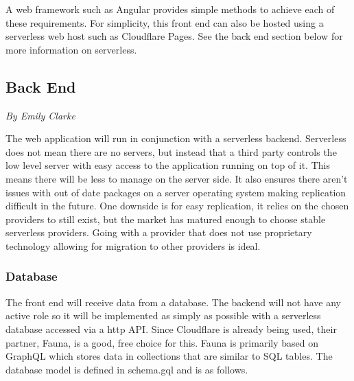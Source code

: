 \documentclass[12pt]{report}
\newcommand{\sectionAuthor}[1]{{\small\vspace{-1em}\textit{#1}}\bigskip\par}
\begin{document}
A web framework such as Angular provides simple methods to achieve each of these requirements. For simplicity, this front end can also be hosted using a serverless web host such as Cloudflare Pages. See the back end section below for more information on serverless.

\subsection{Back End}
\sectionAuthor{By Emily Clarke}
The web application will run in conjunction with a serverless backend. Serverless does not mean there are no servers, but instead that a third party controls the low level server with easy access to the application running on top of it. This means there will be less to manage on the server side. It also ensures there aren't issues with out of date packages on a server operating system making replication difficult in the future. One downside is for easy replication, it relies on the chosen providers to still exist, but the market has matured enough to choose stable serverless providers. Going with a provider that does not use proprietary technology allowing for migration to other providers is ideal.

\subsubsection{Database}
The front end will receive data from a database. The backend will not have any active role so it will be implemented as simply as possible with a serverless database accessed via a http API. Since Cloudflare is already being used, their partner, Fauna, is a good, free choice for this. Fauna is primarily based on GraphQL which stores data in collections that are similar to SQL tables. The database model is defined in schema.gql and is as follows.
\end{document}
